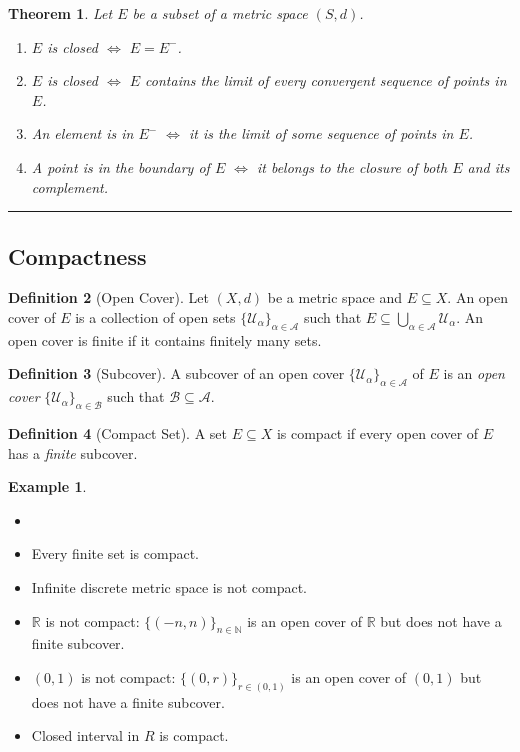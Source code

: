 \documentclass[12pt, lettersize]{book}
\theoremstyle{plain}
\newtheorem{thm}{Theorem}[section]
\theoremstyle{definition}
\newtheorem{dfn}[thm]{Definition}
\newtheorem*{eg}{Example}
\theoremstyle{remark}
\newcommand{\R}{\mathbb{R}}
\newcommand{\N}{\mathbb{N}}
\begin{document}
		\begin{thm}
			Let $E$ be a subset of a metric space $(S,d)$.
			\begin{enumerate}
				\item $E$ is closed $\iff$ $E=E^-$.
				\item $E$ is closed $\iff$ $E$ contains the limit of every convergent sequence of points in $E$.
				\item An element is in $E^-$ $\iff$ it is the limit of some sequence of points in $E$.
				\item A point is in the boundary of $E$ $\iff$ it belongs to the closure of both $E$ and its complement.
			\end{enumerate}
		\end{thm}
		
		\noindent\rule{\textwidth}{1pt}
		\subsection*{Compactness}
		
		\begin{dfn}[Open Cover]
			Let $(X,d)$ be a metric space and $E\subseteq X$. An open cover of $E$ is a collection of open sets $\{\mathcal{U}_\alpha\}_{\alpha\in\mathcal{A}}$ such that $E\subseteq\bigcup_{\alpha\in\mathcal{A}}\mathcal{U}_\alpha$. An open cover is finite if it contains finitely many sets.
		\end{dfn}
		
		\begin{dfn}[Subcover]
			A subcover of an open cover $\{\mathcal{U}_\alpha\}_{\alpha\in\mathcal{A}}$ of $E$ is an \emph{open cover} $\{\mathcal{U}_\alpha\}_{\alpha\in\mathcal{B}}$ such that $\mathcal{B}\subseteq\mathcal{A}$.
		\end{dfn}
		
		\begin{dfn}[Compact Set]
			A set $E\subseteq X$ is compact if every open cover of $E$ has a \emph{finite} subcover.
		\end{dfn}
		\begin{eg}
			\begin{itemize}
				\item[]
				\item Every finite set is compact.
				\item Infinite discrete metric space is not compact.
				\item $\R$ is not compact: $\{(-n,n)\}_{n\in\N}$ is an open cover of $\R$ but does not have a finite subcover.
				\item $(0,1)$ is not compact: $\{(0,r)\}_{r\in(0,1)} $ is an open cover of $(0,1)$ but does not have a finite subcover.
				\item Closed interval in $R$ is compact.
			\end{itemize}
		\end{eg}
		
\end{document}
